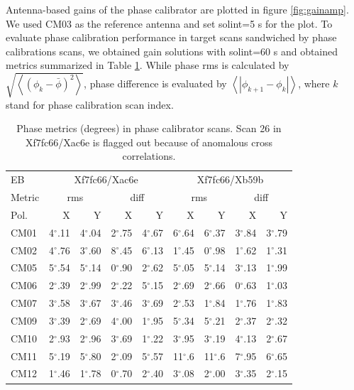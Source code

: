 \documentclass[a4paper, 10pt]{scrartcl}
\begin{document}
Antenna-based gains of the phase calibrator are plotted in figure \ref{fig:gainamp}.
We used CM03 as the reference antenna and set solint=5 s for the plot.
To evaluate phase calibration performance in target scans sandwiched by phase calibrations scans, we obtained gain solutions with solint=60 s and obtained metrics summarized in Table \ref{tab:phasecal}. While phase rms is calculated by $\sqrt{ \left< (\phi_{k} - \bar{\phi})^2 \right> }$, phase difference is evaluated by $\left< | \phi_{k+1} - \phi_k  | \right>$, where $k$ stand for phase calibration scan index.

\begin{table}[h]
\centering
\caption{Phase metrics (degrees) in phase calibrator scans. Scan 26 in Xf7fc66/Xac6e is flagged out because of anomalous cross correlations.}
\label{tab:phasecal}
\begin{tabular}{l|rrrr|rrrr} \hline \hline
EB   & \multicolumn{4}{|c}{Xf7fc66/Xac6e} & \multicolumn{4}{|c}{Xf7fc66/Xb59b} \\
Metric & \multicolumn{2}{|c}{rms} & \multicolumn{2}{c}{diff} & \multicolumn{2}{|c}{rms} & \multicolumn{2}{c}{diff} \\
Pol.  & X & Y & X & Y & X & Y & X & Y \\ \hline
CM01 & 4$^{\circ}.$11 & 4$^{\circ}.$04 & 2$^{\circ}.$75 & 4$^{\circ}.$67 & 6$^{\circ}.$64 & 6$^{\circ}.$37 & 3$^{\circ}.$84 & 3$^{\circ}.$79 \\
CM02 & 4$^{\circ}.$76 & 3$^{\circ}.$60 & 8$^{\circ}.$45 & 6$^{\circ}.$13 & 1$^{\circ}.$45 & 0$^{\circ}.$98 & 1$^{\circ}.$62 & 1$^{\circ}.$31 \\
CM05 & 5$^{\circ}.$54 & 5$^{\circ}.$14 & 0$^{\circ}.$90 & 2$^{\circ}.$62 & 5$^{\circ}.$05 & 5$^{\circ}.$14 & 3$^{\circ}.$13 & 1$^{\circ}.$99 \\
CM06 & 2$^{\circ}.$39 & 2$^{\circ}.$99 & 2$^{\circ}.$22 & 5$^{\circ}.$15 & 2$^{\circ}.$69 & 2$^{\circ}.$66 & 0$^{\circ}.$63 & 1$^{\circ}.$03 \\
CM07 & 3$^{\circ}.$58 & 3$^{\circ}.$67 & 3$^{\circ}.$46 & 3$^{\circ}.$69 & 2$^{\circ}.$53 & 1$^{\circ}.$84 & 1$^{\circ}.$76 & 1$^{\circ}.$83 \\
CM09 & 3$^{\circ}.$39 & 2$^{\circ}.$69 & 4$^{\circ}.$00 & 1$^{\circ}.$95 & 5$^{\circ}.$34 & 5$^{\circ}.$21 & 2$^{\circ}.$37 & 2$^{\circ}.$32 \\
CM10 & 2$^{\circ}.$93 & 2$^{\circ}.$96 & 3$^{\circ}.$69 & 1$^{\circ}.$22 & 3$^{\circ}.$95 & 3$^{\circ}.$19 & 4$^{\circ}.$13 & 2$^{\circ}.$67 \\
CM11 & 5$^{\circ}.$19 & 5$^{\circ}.$80 & 2$^{\circ}.$09 & 5$^{\circ}.$57 & 11$^{\circ}.$6 & 11$^{\circ}.$6 & 7$^{\circ}.$95 & 6$^{\circ}.$65 \\
CM12 & 1$^{\circ}.$46 & 1$^{\circ}.$78 & 0$^{\circ}.$70 & 2$^{\circ}.$40 & 3$^{\circ}.$08 & 2$^{\circ}.$00 & 3$^{\circ}.$35 & 2$^{\circ}.$15 \\ \hline
\end{tabular}
\end{table}
\end{document}
